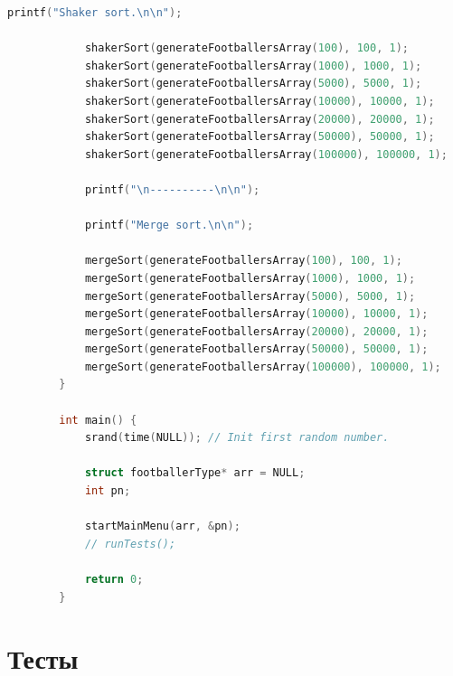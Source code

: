 \documentclass[12pt]{article}
\begin{document}
\begin{lstlisting}[language=C]
			printf("Shaker sort.\n\n");
			
			shakerSort(generateFootballersArray(100), 100, 1);
			shakerSort(generateFootballersArray(1000), 1000, 1);
			shakerSort(generateFootballersArray(5000), 5000, 1);
			shakerSort(generateFootballersArray(10000), 10000, 1);
			shakerSort(generateFootballersArray(20000), 20000, 1);
			shakerSort(generateFootballersArray(50000), 50000, 1);
			shakerSort(generateFootballersArray(100000), 100000, 1);
			
			printf("\n----------\n\n");
			
			printf("Merge sort.\n\n");
			
			mergeSort(generateFootballersArray(100), 100, 1);
			mergeSort(generateFootballersArray(1000), 1000, 1);
			mergeSort(generateFootballersArray(5000), 5000, 1);
			mergeSort(generateFootballersArray(10000), 10000, 1);
			mergeSort(generateFootballersArray(20000), 20000, 1);
			mergeSort(generateFootballersArray(50000), 50000, 1);
			mergeSort(generateFootballersArray(100000), 100000, 1);
		}
		
		int main() {
			srand(time(NULL)); // Init first random number.
			
			struct footballerType* arr = NULL;
			int pn;
			
			startMainMenu(arr, &pn);
			// runTests();
			
			return 0;
		}
	\end{lstlisting}
	
	\newpage
	
	\section{Тесты}
	
\end{document}
